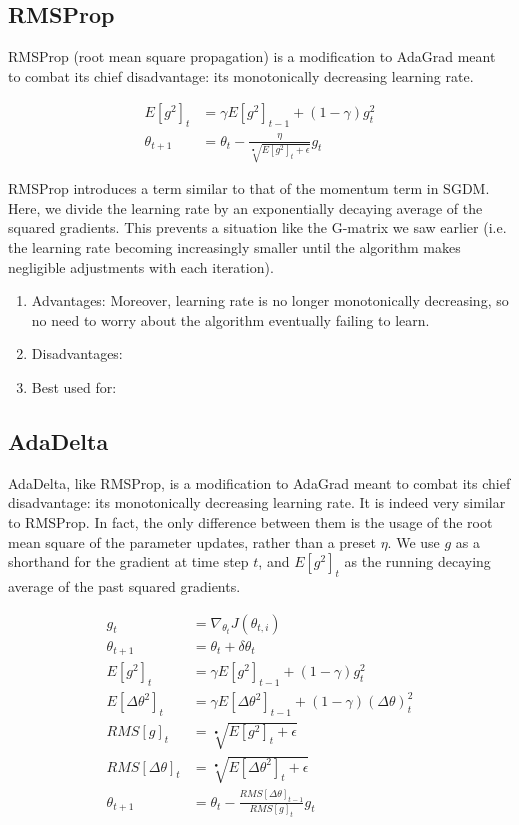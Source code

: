 \documentclass[twoside,11pt]{homework}
\begin{document}
\subsection*{RMSProp}
RMSProp (root mean square propagation) is a modification to AdaGrad meant to combat its chief disadvantage: its monotonically decreasing learning rate. 

\begin{align*}
	E[g^2]_t &= \gamma E[g^2]_{t-1} + (1-\gamma)g^2_t\\
	\theta_{t+1} &= \theta_t - \frac{\eta}{\sqrt[•]{E[g^2]_t+\epsilon}} g_t
\end{align*}

RMSProp introduces a term similar to that of the momentum term in SGDM. Here, we divide the learning rate by an exponentially decaying average of the squared gradients. This prevents a situation like the G-matrix we saw earlier (i.e. the learning rate becoming increasingly smaller until the algorithm makes negligible adjustments with each iteration).

\begin{enumerate}
	\item Advantages: Moreover, learning rate is no longer monotonically decreasing, so no need to worry about the algorithm eventually failing to learn.
	\item Disadvantages:
	\item Best used for:
\end{enumerate}
\subsection*{AdaDelta}
AdaDelta, like RMSProp, is a modification to AdaGrad meant to combat its chief disadvantage: its monotonically decreasing learning  rate. It is indeed very similar to RMSProp. In fact, the only difference between them is the usage of the root mean square of the parameter updates, rather than a preset $\eta$. We use $g$ as a shorthand for the gradient at time step $t$, and $E[g^2]_t$ as the running decaying average of the past squared gradients.

\begin{align*}
	g_t &= \nabla_{\theta_t} J(\theta_{t, i})\\
	\theta_{t+1} &= \theta_t + \delta \theta_t\\
	E[g^2]_t &= \gamma E[g^2]_{t-1} + (1-\gamma)g^2_t \\
	E[\Delta \theta^2]_t &= \gamma E[\Delta \theta^2]_{t-1} + (1-\gamma)(\Delta \theta)^2_t \\
	RMS[g]_t &= \sqrt[•]{E[g^2]_t+\epsilon}\\
	RMS[\Delta \theta]_t &= \sqrt[•]{E[\Delta \theta^2]_t+\epsilon}\\
	\theta_{t+1} &= \theta_t - \frac{RMS[\Delta \theta]_{t-1}}{RMS[g]_t} g_t\\
\end{align*}
\end{document}
